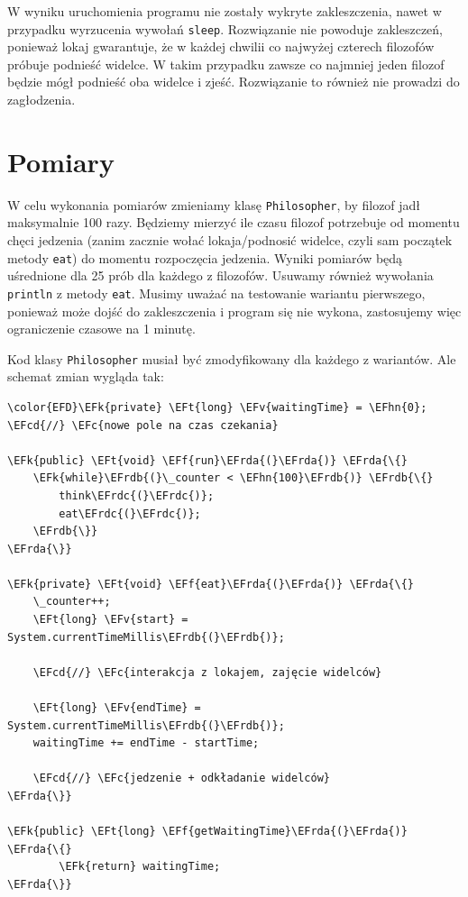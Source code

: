 \documentclass[11pt]{article}
\newcommand{\EFc}[1]{\textcolor{EFc}{#1}} %
\newcommand{\EFcd}[1]{\textcolor{EFcd}{#1}} %
\newcommand{\EFk}[1]{\textcolor{EFk}{#1}} %
\newcommand{\EFf}[1]{\textcolor{EFf}{#1}} %
\newcommand{\EFv}[1]{\textcolor{EFv}{#1}} %
\newcommand{\EFt}[1]{\textcolor{EFt}{#1}} %
\newcommand{\EFhn}[1]{\textcolor{EFhn}{#1}} %
\newcommand{\EFrda}[1]{\textcolor{EFrda}{#1}} %
\newcommand{\EFrdb}[1]{\textcolor{EFrdb}{#1}} %
\newcommand{\EFrdc}[1]{\textcolor{EFrdc}{#1}} %
\begin{document}
W wyniku uruchomienia programu nie zostały wykryte zakleszczenia, nawet w przypadku wyrzucenia
wywołań \texttt{sleep}.
Rozwiązanie nie powoduje zakleszczeń, ponieważ lokaj gwarantuje, że w każdej chwilii co najwyżej czterech
filozofów próbuje podnieść widelce. W takim przypadku zawsze co najmniej jeden filozof będzie mógł
podnieść oba widelce i zjeść. Rozwiązanie to również nie prowadzi do zagłodzenia.
\section*{Pomiary}
\label{sec:org89b94cc}
W celu wykonania pomiarów zmieniamy klasę \texttt{Philosopher}, by
filozof jadł maksymalnie 100 razy.
Będziemy mierzyć ile czasu filozof potrzebuje od momentu chęci jedzenia
(zanim zacznie wołać lokaja/podnosić widelce, czyli sam początek metody \texttt{eat})
do momentu rozpoczęcia jedzenia.
Wyniki pomiarów będą uśrednione dla 25 prób dla każdego z filozofów.
Usuwamy również wywołania \texttt{println} z metody \texttt{eat}.
Musimy uważać na testowanie
wariantu pierwszego, ponieważ może dojść do zakleszczenia i program się nie wykona,
zastosujemy więc ograniczenie czasowe na 1 minutę.

Kod klasy \texttt{Philosopher} musiał być zmodyfikowany dla każdego z wariantów.
Ale schemat zmian wygląda tak:
\begin{Code}
\begin{Verbatim}
\color{EFD}\EFk{private} \EFt{long} \EFv{waitingTime} = \EFhn{0}; \EFcd{//} \EFc{nowe pole na czas czekania}

\EFk{public} \EFt{void} \EFf{run}\EFrda{(}\EFrda{)} \EFrda{\{}
    \EFk{while}\EFrdb{(}\_counter < \EFhn{100}\EFrdb{)} \EFrdb{\{}
        think\EFrdc{(}\EFrdc{)};
        eat\EFrdc{(}\EFrdc{)};
    \EFrdb{\}}
\EFrda{\}}

\EFk{private} \EFt{void} \EFf{eat}\EFrda{(}\EFrda{)} \EFrda{\{}
    \_counter++;
    \EFt{long} \EFv{start} = System.currentTimeMillis\EFrdb{(}\EFrdb{)};

    \EFcd{//} \EFc{interakcja z lokajem, zajęcie widelców}

    \EFt{long} \EFv{endTime} = System.currentTimeMillis\EFrdb{(}\EFrdb{)};
    waitingTime += endTime - startTime;

    \EFcd{//} \EFc{jedzenie + odkładanie widelców}
\EFrda{\}}

\EFk{public} \EFt{long} \EFf{getWaitingTime}\EFrda{(}\EFrda{)} \EFrda{\{}
        \EFk{return} waitingTime;
\EFrda{\}}
\end{Verbatim}
\end{Code}
\end{document}
